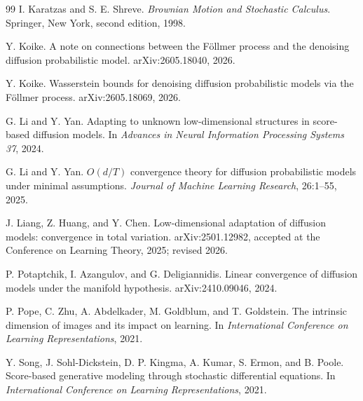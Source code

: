 \documentclass[11pt]{article}
\theoremstyle{definition}
\begin{document}
\begin{thebibliography}{99}
I. Karatzas and S. E. Shreve.
\newblock \emph{Brownian Motion and Stochastic Calculus}.
\newblock Springer, New York, second edition, 1998.

Y. Koike.
\newblock A note on connections between the F\"ollmer process and the denoising diffusion probabilistic model.
\newblock arXiv:2605.18040, 2026.

Y. Koike.
\newblock Wasserstein bounds for denoising diffusion probabilistic models via the F\"ollmer process.
\newblock arXiv:2605.18069, 2026.

G. Li and Y. Yan.
\newblock Adapting to unknown low-dimensional structures in score-based diffusion models.
\newblock In \emph{Advances in Neural Information Processing Systems 37}, 2024.

G. Li and Y. Yan.
\newblock $O(d/T)$ convergence theory for diffusion probabilistic models under minimal assumptions.
\newblock \emph{Journal of Machine Learning Research}, 26:1--55, 2025.

J. Liang, Z. Huang, and Y. Chen.
\newblock Low-dimensional adaptation of diffusion models: convergence in total variation.
\newblock arXiv:2501.12982, accepted at the Conference on Learning Theory, 2025; revised 2026.

P. Potaptchik, I. Azangulov, and G. Deligiannidis.
\newblock Linear convergence of diffusion models under the manifold hypothesis.
\newblock arXiv:2410.09046, 2024.

P. Pope, C. Zhu, A. Abdelkader, M. Goldblum, and T. Goldstein.
\newblock The intrinsic dimension of images and its impact on learning.
\newblock In \emph{International Conference on Learning Representations}, 2021.

Y. Song, J. Sohl-Dickstein, D. P. Kingma, A. Kumar, S. Ermon, and B. Poole.
\newblock Score-based generative modeling through stochastic differential equations.
\newblock In \emph{International Conference on Learning Representations}, 2021.


\end{thebibliography}
\end{document}
